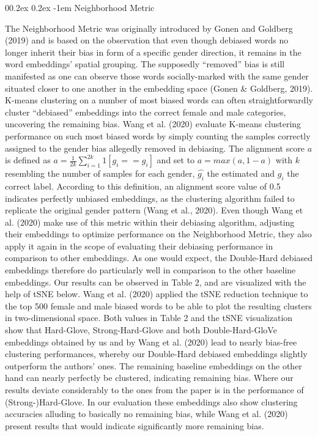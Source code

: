 \documentclass[
  english,
  man,floatsintext]{apa6}
\makeatletter
\let\oldparagraph\paragraph
\renewcommand{\paragraph}[1]{\oldparagraph{#1}\mbox{}}
\renewcommand{\paragraph}{\@startsection{paragraph}{4}{\parindent}%
  {0\baselineskip \@plus 0.2ex \@minus 0.2ex}%
  {-1em}%
  {\normalfont\normalsize\bfseries\itshape\typesectitle}}
\makeatother
\begin{document}
\hypertarget{neighborhood-metric}{%
\paragraph{Neighborhood Metric}\label{neighborhood-metric}}

The Neighborhood Metric was originally introduced by Gonen and Goldberg (2019) and is based on the observation that even though debiased words no longer inherit their bias in form of a specific gender direction, it remains in the word embeddings' spatial grouping. The supposedly \enquote{removed} bias is still manifested as one can observe those words socially-marked with the same gender situated closer to one another in the embedding space (Gonen \& Goldberg, 2019).
K-means clustering on a number of most biased words can often straightforwardly cluster \enquote{debiased} embeddings into the correct female and male categories, uncovering the remaining bias.
Wang et al. (2020) evaluate K-means clustering performance on such most biased words by simply counting the samples correctly assigned to the gender bias allegedly removed in debiasing. The alignment score \(a\) is defined as \(a = \frac{1}{2k}\sum_{i=1}^{2k}1[\hat{g_{i}}== g_{i}]\) and set to \(a = max(a, 1-a)\) with \(k\) resembling the number of samples for each gender, \(\hat{g_{i}}\) the estimated and \(g_{i}\) the correct label. According to this definition, an alignment score value of 0.5 indicates perfectly unbiased embeddings, as the clustering algorithm failed to replicate the original gender pattern (Wang et al., 2020).
Even though Wang et al. (2020) make use of this metric within their debiasing algorithm, adjusting their embeddings to optimize performance on the Neighborhood Metric, they also apply it again in the scope of evaluating their debiasing performance in comparison to other embeddings. As one would expect, the Double-Hard debiased embeddings therefore do particularly well in comparison to the other baseline embeddings.
Our results can be observed in Table 2, and are visualized with the help of tSNE below. Wang et al. (2020) applied the tSNE reduction technique to the top 500 female and male biased words to be able to plot the resulting clusters in two-dimensional space. Both values in Table 2 and the tSNE visualization show that Hard-Glove, Strong-Hard-Glove and both Double-Hard-GloVe embeddings obtained by us and by Wang et al. (2020) lead to nearly bias-free clustering performances, whereby our Double-Hard debiased embeddings slightly outperform the authors' ones. The remaining baseline embeddings on the other hand can nearly perfectly be clustered, indicating remaining bias.
Where our results deviate considerably to the ones from the paper is in the performance of (Strong-)Hard-Glove. In our evaluation these embeddings also show clustering accuracies alluding to basically no remaining bias, while Wang et al. (2020) present results that would indicate significantly more remaining bias.
\end{document}
